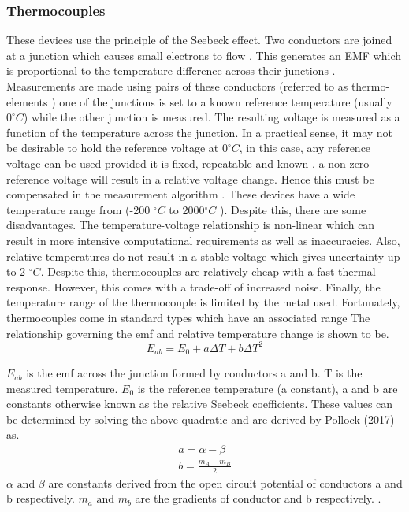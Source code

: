 \subsubsection{Thermocouples}

These devices use the principle of the Seebeck effect. Two conductors are joined at a junction which causes small electrons to flow \cite{pollock2017thermocouples}. This generates an EMF which is proportional to the temperature difference across their junctions \cite{pollock2017thermocouples}. Measurements are made using pairs of these conductors (referred to as thermo-elements \cite{pollock2017thermocouples}) one of the junctions is set to a known reference temperature (usually $0^\circ C$) while the other junction is measured. The resulting voltage is measured as a function of the temperature across the junction. In a practical sense, it may not be desirable to hold the reference voltage at $0^\circ C$, in this case, any reference voltage can be used provided it is fixed, repeatable and known \cite{pollock2017thermocouples}. a non-zero reference voltage will result in a relative voltage change. Hence this must be compensated in the measurement algorithm \cite{pollock2017thermocouples}. These devices have a wide temperature range from (-200 $^\circ C$ to 2000$^\circ C$ \cite{tong2001improving}). Despite this, there are some disadvantages. The temperature-voltage relationship is non-linear \cite{pollock2017thermocouples} \cite{tong2001improving} which can result in more intensive computational requirements as well as inaccuracies. Also, relative temperatures do not result in a stable voltage which gives uncertainty up to 2 $^\circ C$. Despite this, thermocouples are relatively cheap with a fast thermal response. However, this comes with a trade-off of increased noise. Finally, the temperature range of the thermocouple is limited by the metal used. Fortunately, thermocouples come in standard types \cite{tong2001improving} which have an associated range \cite{tong2001improving}
The relationship governing the emf and relative temperature change is shown to be. 
\begin{equation}
	E_{ab} = E_0 + a \Delta T+ b\Delta T^2
\end{equation}

$E_{ab}$ is the emf across the junction formed by conductors a and b. T is the measured temperature. $E_0$ is the reference temperature (a constant),  a and b are constants otherwise known as the relative Seebeck coefficients. These values can be determined by solving the above quadratic and are derived by Pollock (2017) as.
\begin{subequations}
	\begin{align}
		a = \alpha - \beta\\
		b = \frac{m_A-m_B}{2}
	\end{align}
\end{subequations}
$\alpha \text{ and } \beta$ are constants derived from the open circuit potential of conductors a and b respectively. $m_a\text{ and } m_b$ are the gradients of conductor and b respectively. \cite{pollock2017thermocouples}. 
